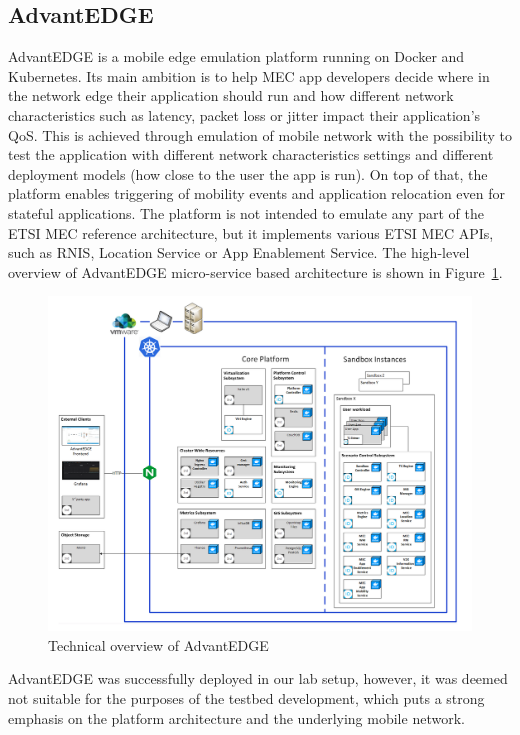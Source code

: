 \documentclass[12pt,a4paper,twoside]{report}
\begin{document}
\subsection{AdvantEDGE}
AdvantEDGE is a mobile edge emulation platform running on Docker and Kubernetes. Its main ambition is to help MEC app developers decide where in the network edge their application should run and how different network characteristics such as latency, packet loss or jitter impact their application’s QoS. This is achieved through emulation of mobile network with the possibility to test the application with different network characteristics settings and different deployment models (how close to the user the app is run). On top of that, the platform enables triggering of mobility events and application relocation even for stateful applications. The platform is not intended to emulate any part of the ETSI MEC reference architecture, but it implements various ETSI MEC APIs, such as RNIS, Location Service or App Enablement Service. The high-level overview of AdvantEDGE micro-service based architecture is shown in Figure~\ref{F:advantedge}. \cite{advantedge-docu}
\begin{figure}[ht]
	\centering
	\includegraphics[width=13cm]{./images/advatnedge.png} 
	\caption{Technical overview of AdvantEDGE \cite{advantedge-docu}}
	\label{F:advantedge}
\end{figure}

AdvantEDGE was successfully deployed in our lab setup, however, it was deemed not suitable for the purposes of the testbed development, which puts a strong emphasis on the platform architecture and the underlying mobile network.
\end{document}
